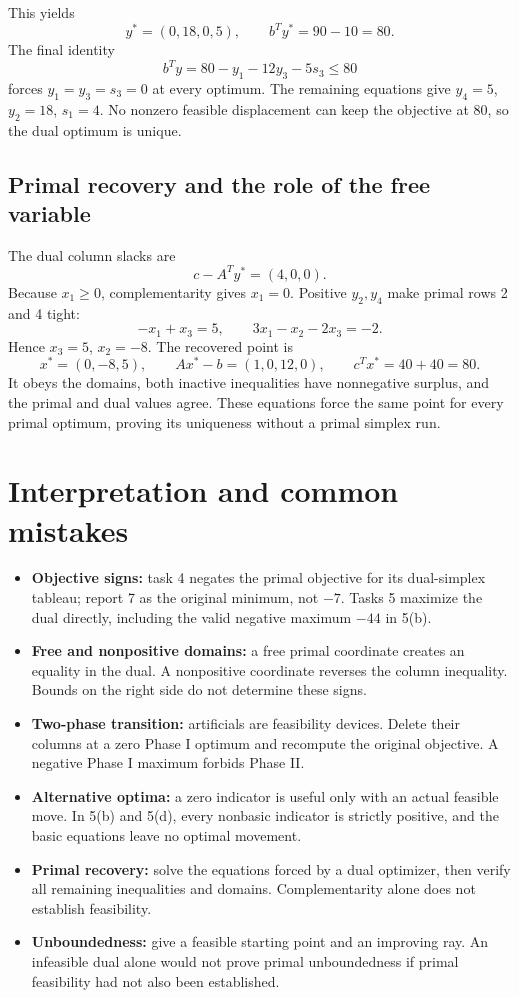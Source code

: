 \documentclass[11pt,a4paper]{article}
\begin{document}
This yields
\[
  y^*=(0,18,0,5),\qquad b^Ty^*=90-10=80.
\]
The final identity
\begin{equation}\label{eq:task5d-bound}
  b^Ty=80-y_1-12y_3-5s_3\leq80
\end{equation}
forces $y_1=y_3=s_3=0$ at every optimum. The remaining equations give
$y_4=5$, $y_2=18$, $s_1=4$. No nonzero feasible displacement can keep the
objective at 80, so the dual optimum is unique.

\subsection{Primal recovery and the role of the free variable}
The dual column slacks are
\[
  c-A^Ty^*=(4,0,0).
\]
Because $x_1\geq0$, complementarity gives $x_1=0$. Positive $y_2,y_4$ make
primal rows 2 and 4 tight:
\[
  -x_1+x_3=5,\qquad3x_1-x_2-2x_3=-2.
\]
Hence $x_3=5$, $x_2=-8$. The recovered point is
\[
  x^*=(0,-8,5),\qquad Ax^*-b=(1,0,12,0),\qquad
  c^Tx^*=40+40=80.
\]
It obeys the domains, both inactive inequalities have nonnegative surplus,
and the primal and dual values agree. These equations force the same point
for every primal optimum, proving its uniqueness without a primal simplex run.

\section{Interpretation and common mistakes}\label{sec:interpretation}
\begin{itemize}[leftmargin=*]
  \item \textbf{Objective signs:} task 4 negates the primal objective for its
        dual-simplex tableau; report 7 as the original minimum, not $-7$.
        Tasks 5 maximize the dual directly, including the valid negative maximum
        $-44$ in 5(b).
  \item \textbf{Free and nonpositive domains:} a free primal coordinate creates
        an equality in the dual. A nonpositive coordinate reverses the column
        inequality. Bounds on the right side do not determine these signs.
  \item \textbf{Two-phase transition:} artificials are feasibility devices.
        Delete their columns at a zero Phase I optimum and recompute the original
        objective. A negative Phase I maximum forbids Phase II.
  \item \textbf{Alternative optima:} a zero indicator is useful only with an
        actual feasible move. In 5(b) and 5(d), every nonbasic indicator is
        strictly positive, and the basic equations leave no optimal movement.
  \item \textbf{Primal recovery:} solve the equations forced by a dual optimizer,
        then verify all remaining inequalities and domains. Complementarity
        alone does not establish feasibility.
  \item \textbf{Unboundedness:} give a feasible starting point and an improving
        ray. An infeasible dual alone would not prove primal unboundedness if
        primal feasibility had not also been established.
\end{itemize}
\end{document}
